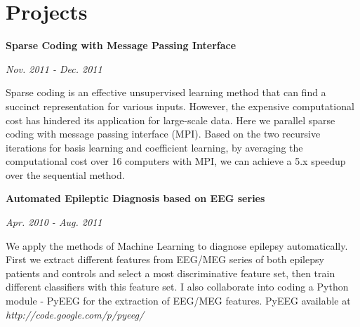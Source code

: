 \documentclass[letterpaper, 10pt]{article}
\renewenvironment{itemize}{
  \begin{list}{}{
    \setlength{\leftmargin}{1.5em}
  }
}{
  \end{list}
}
\begin{document}
\vspace{-0.2in}
\section*{Projects}
\begin{itemize}
\item \textbf{Sparse Coding with Message Passing Interface}

\hspace{5.2in} \textit{Nov. 2011 - Dec. 2011}
\begin{itemize}
\item{Sparse coding is an effective unsupervised learning method that can find a succinct representation for various inputs. However, the
expensive computational cost has hindered its application for large-scale data. Here we parallel sparse coding with message passing interface (MPI). Based on the two recursive iterations for basis learning and coefficient learning, by averaging the computational cost over 16 computers with MPI, we can achieve a 5.x speedup over the sequential method.
}
\end{itemize}
\item \textbf{Automated Epileptic Diagnosis based on {EEG} series}

\hspace{5.2in} \textit{Apr. 2010 - Aug. 2011}
\begin{itemize}
\item{We apply the methods of Machine Learning to diagnose epilepsy automatically. First we extract different features
from {EEG/MEG} series of both epilepsy patients and controls and select a most discriminative feature set, then train different classifiers with
this feature set. I also collaborate into coding a Python module - {PyEEG} for the extraction of {EEG/MEG} features. {PyEEG} available at 
\textit{http://code.google.com/p/pyeeg/}}
\end{itemize}

%
\end{itemize}
\end{document}
